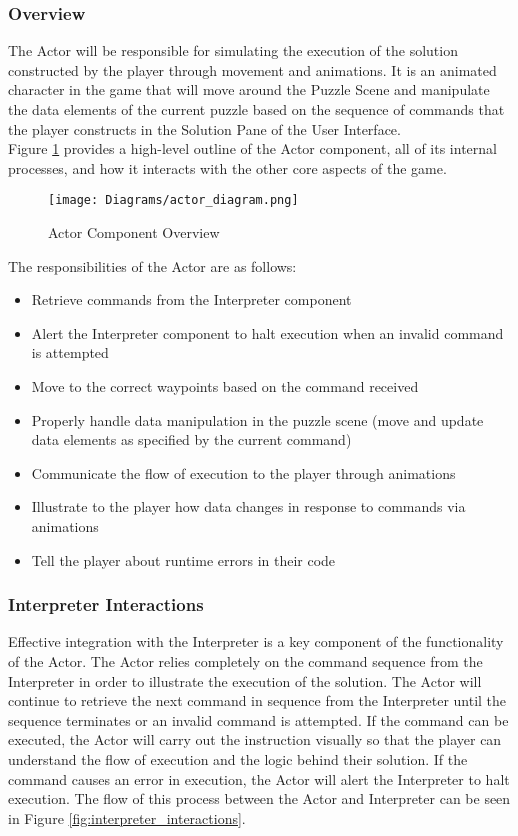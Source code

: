 \subsubsection{Overview}
The Actor will be responsible for simulating the execution of the solution constructed
by the player through movement and animations. It is an animated character in the game that will move around the Puzzle Scene and manipulate the data elements of the current puzzle based on the sequence of commands that the player constructs in the Solution Pane of the User Interface. \\

Figure \ref{fig:actor_diagram} provides a high-level outline of the Actor component, all of its internal processes, and how it interacts with the other core aspects of the game.\\

\begin{figure}[!htb]
  \caption{Actor Component Overview}
  \label{fig:actor_diagram}
  \centering
  \texttt{[image: Diagrams/actor\_diagram.png]}
\end{figure}
\newpage
The responsibilities of the Actor are as follows:

\begin{itemize}
	\item Retrieve commands from the Interpreter component
	\item Alert the Interpreter component to halt execution when an invalid command is attempted
	\item Move to the correct waypoints based on the command received
	\item Properly handle data manipulation in the puzzle scene (move and update data elements
			as specified by the current command)
	\item Communicate the flow of execution to the player through animations
	\item Illustrate to the player how data changes in response to commands via animations
	\item Tell the player about runtime errors in their code
\end{itemize}

\subsubsection{Interpreter Interactions}
Effective integration with the Interpreter is a key component of the functionality of the Actor. The Actor relies completely on the command sequence from the Interpreter in order to illustrate the execution of the solution. The Actor will continue to retrieve the next command in sequence from the Interpreter until the sequence terminates or an invalid command is attempted. If the command can be executed, the Actor will carry out the instruction visually so that the player can understand the flow of execution and the logic behind their solution. If the command causes an error in execution, the Actor will alert the Interpreter to halt execution. The flow of this process between the Actor and Interpreter can be seen in Figure \ref{fig:interpreter_interactions}.\\

